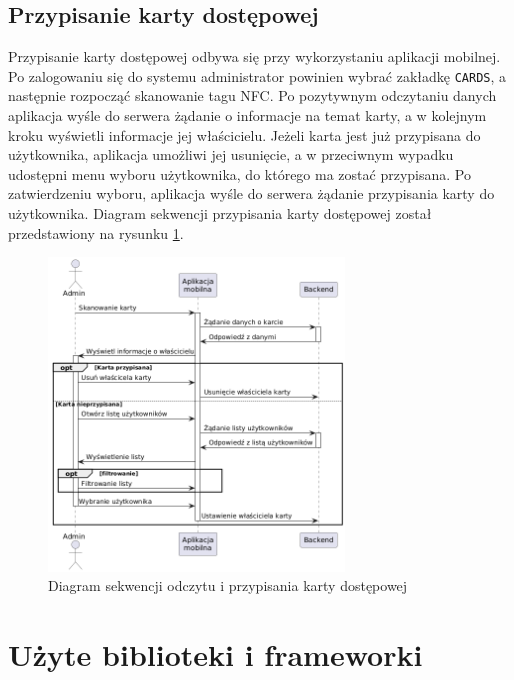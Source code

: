 \subsection{Przypisanie  karty dostępowej}

Przypisanie karty dostępowej odbywa się przy wykorzystaniu aplikacji mobilnej. Po zalogowaniu się do systemu administrator powinien wybrać zakładkę \texttt{CARDS}, a następnie rozpocząć skanowanie tagu NFC. Po pozytywnym odczytaniu danych aplikacja wyśle do serwera żądanie o informacje na temat karty, a w kolejnym kroku wyświetli informacje jej właścicielu. Jeżeli karta jest już przypisana do użytkownika, aplikacja umożliwi jej usunięcie, a w przeciwnym wypadku udostępni menu wyboru użytkownika, do którego ma zostać przypisana. Po zatwierdzeniu wyboru, aplikacja wyśle do serwera żądanie przypisania karty do użytkownika. Diagram sekwencji przypisania karty dostępowej został przedstawiony na rysunku \ref{fig:assignCard}.


\begin{figure}[H]
    \centering
    \includegraphics[width=0.7\textwidth]{graf/cardSeq.png}
    \caption{Diagram sekwencji odczytu i przypisania karty dostępowej}
    \label{fig:assignCard}
\end{figure}

\section{Użyte biblioteki i frameworki}

